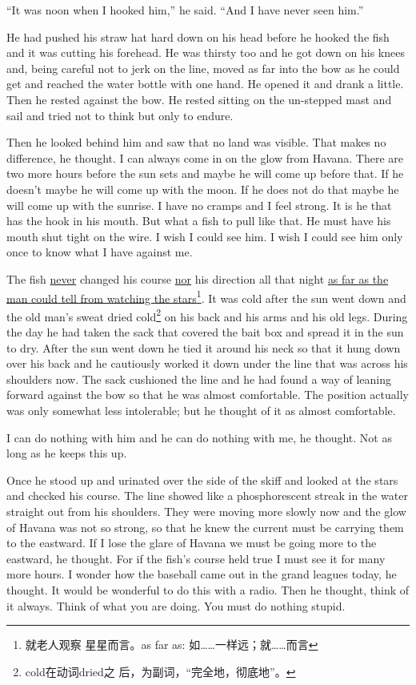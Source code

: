 \documentclass[fontset=ubuntu]{ctexrep}
\begin{document}
``It was noon when I hooked him,'' he said. ``And I have never seen him.''

He had pushed his \gls{straw} hat hard down on his head before he hooked the fish
and it was cutting his \gls{forehead}. He was \gls{thirsty} too and he got down on
his knees and, being careful not to \gls{jerk} on the line, moved as far
into the bow as he could get and reached the water bottle with one hand. He
opened it and drank a little. Then he rested against the bow. He rested
sitting on the \gls{un-stepped} mast and sail and tried not to think but
only to \gls{endure}.


Then he looked behind him and saw that no land was \gls{visible}. That makes no
difference, he thought. I can always come in on the \gls{glow} from Havana.
There are two more hours before the sun sets and maybe he will come up
before that. If he doesn't maybe he will come up with the moon. If he does
not do that maybe he will come up with the sunrise. I have no \glspl{cramp}
and I feel strong. It is he that has the hook in his mouth. But what a fish
to pull like that. He must have his mouth shut \gls{tight} on the wire. I
wish I could see him. I wish I could see him only once to know what I have
against me.


The fish \uline{never} changed his \gls{course} \uline{nor} his direction all that night
\uline{as far as the man could tell from watching the stars}\footnote{就老人观察
  星星而言。as far as: 如……一样远；就……而言}. It was cold after the sun
went down and the old man's sweat dried cold\footnote{cold在动词dried之
  后，为副词，“完全地，彻底地”。} on his back and his arms and his old
legs. During the day he had taken the sack that covered the bait box and
spread it in the sun to dry. After the sun went down he tied it around his
neck so that it hung down over his back and he \gls{cautiously} worked it
down under the line that was across his shoulders now. The sack
\gls{cushioned} the line and he had found a way of leaning forward against
the bow so that he was almost \gls{comfortable}. The position actually was only
\gls{somewhat} less \gls{intolerable}; but he thought of it as almost comfortable.

I can do nothing with him and he can do nothing with me, he thought. Not as
long as he keeps this up.

Once he stood up and urinated over the side of the skiff and looked at
the stars and checked his course. The line showed like a
\gls{phosphorescent} \gls{streak} in the water straight out from his
shoulders. They were moving more slowly now and the glow of Havana was not
so strong, so that he knew the current must be carrying them to the
\gls{eastward}. If I lose the glare of Havana we must be going more to the
eastward, he thought. For if the fish's course held true I must see it for
many more hours. I wonder how the baseball came out in the grand leagues
today, he thought. It would be wonderful to do this with a radio. Then he
thought, think of it always. Think of what you are doing. You must do
nothing stupid.
\end{document}
